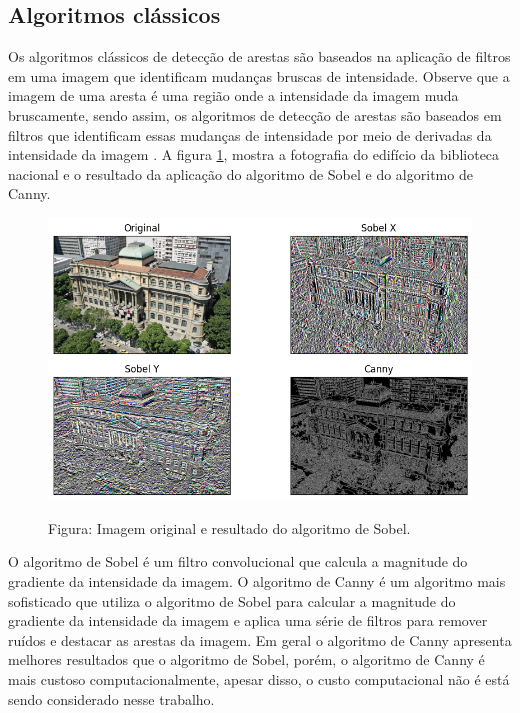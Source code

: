 \documentclass[12pt]{article}
\begin{document}
\subsection{Algoritmos clássicos}

Os algoritmos clássicos de detecção de arestas são baseados na aplicação de filtros em uma imagem que identificam mudanças bruscas de intensidade. Observe que a imagem de uma aresta é uma região onde a intensidade da imagem muda bruscamente, sendo assim, os algoritmos de detecção de arestas são baseados em filtros que identificam essas mudanças de intensidade por meio de derivadas da intensidade da imagem \cite{shrivakshan2012comparison}. A figura \ref{fig:sobel}, mostra a fotografia do edifício da biblioteca nacional e o resultado da aplicação do algoritmo de Sobel e do algoritmo de Canny.

\begin{figure}[H]
\centering
\includegraphics[scale=0.70]{sobel.png}
\label{fig:sobel}
\begin{center}
Figura: Imagem original e resultado do algoritmo de Sobel.
\end{center}
\end{figure}

O algoritmo de Sobel é um filtro convolucional que calcula a magnitude do gradiente da intensidade da imagem. O algoritmo de Canny é um algoritmo mais sofisticado que utiliza o algoritmo de Sobel para calcular a magnitude do gradiente da intensidade da imagem e aplica uma série de filtros para remover ruídos e destacar as arestas da imagem. Em geral o algoritmo de Canny apresenta melhores resultados que o algoritmo de Sobel, porém, o algoritmo de Canny é mais custoso computacionalmente, apesar disso, o custo computacional não é está sendo considerado nesse trabalho.
\end{document}
